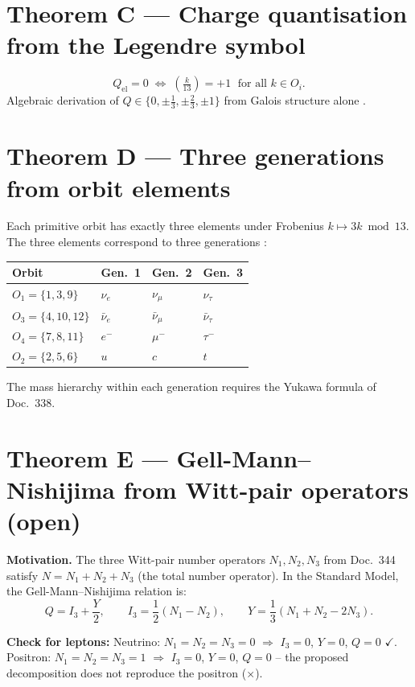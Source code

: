\section{Theorem C --- Charge quantisation from the Legendre symbol}

\[
  Q_\mathrm{el}=0 \;\Longleftrightarrow\; \left(\tfrac{k}{13}\right)=+1
  \;\text{ for all } k\in O_i.
\]
Algebraic derivation of $Q\in\{0,\pm\tfrac{1}{3},\pm\tfrac{2}{3},\pm1\}$
from Galois structure alone \BM.

\section{Theorem D --- Three generations from orbit elements}

Each primitive orbit has exactly three elements under Frobenius $k\mapsto3k\bmod13$.
The three elements correspond to three generations \SM:

\begin{center}
\begin{tabular}{llll}
\toprule
Orbit & Gen.~1 & Gen.~2 & Gen.~3 \\
\midrule
$O_1=\{1,3,9\}$ & $\nu_e$ & $\nu_\mu$ & $\nu_\tau$ \\
$O_3=\{4,10,12\}$ & $\bar\nu_e$ & $\bar\nu_\mu$ & $\bar\nu_\tau$ \\
$O_4=\{7,8,11\}$ & $e^-$ & $\mu^-$ & $\tau^-$ \\
$O_2=\{2,5,6\}$ & $u$ & $c$ & $t$ \\
\bottomrule
\end{tabular}
\end{center}

The mass hierarchy within each generation requires the Yukawa formula of Doc.~338.

\section{Theorem E --- Gell-Mann--Nishijima from Witt-pair operators (open) \SM}

\textbf{Motivation.} The three Witt-pair number operators $N_1,N_2,N_3$ from
Doc.~344 satisfy $N=N_1+N_2+N_3$ (the total number operator). In the Standard
Model, the Gell-Mann--Nishijima relation is:
\[
  Q = I_3 + \frac{Y}{2}, \qquad
  I_3 = \frac{1}{2}(N_1-N_2), \qquad
  Y = \frac{1}{3}(N_1+N_2-2N_3).
\]

\textbf{Check for leptons:} Neutrino: $N_1=N_2=N_3=0$ $\Rightarrow$ $I_3=0$,
$Y=0$, $Q=0$ $\checkmark$. Positron: $N_1=N_2=N_3=1$ $\Rightarrow$ $I_3=0$,
$Y=0$, $Q=0$ -- the proposed decomposition does not reproduce the positron ($\times$).

